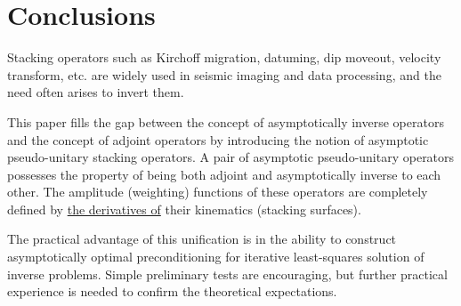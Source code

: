 \section{Conclusions}
\par
Stacking operators such as Kirchoff migration, datuming, dip moveout,
velocity transform, etc. are widely used in seismic imaging and data 
processing, and the need often arises to invert them. 

This paper fills the gap between the concept of asymptotically inverse
operators and the concept of adjoint operators by introducing the notion of
asymptotic pseudo-unitary stacking operators. A pair of asymptotic
pseudo-unitary operators possesses the property of being both adjoint and
asymptotically inverse to each other. The amplitude (weighting) functions of
these operators are completely defined by \uline{the derivatives of} their 
kinematics (stacking surfaces).

The practical advantage of this unification is in the ability to
construct asymptotically optimal preconditioning for iterative
least-squares solution of inverse problems. Simple preliminary tests
are encouraging, but further practical experience is needed to confirm
the theoretical expectations.



